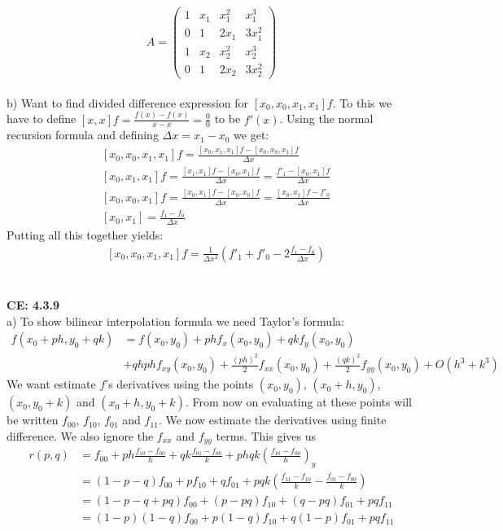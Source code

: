 \documentclass[11pt,a4paper]{report}
\begin{document}
$$ 
A = 
 \begin{pmatrix}
  1 & x_1 & x_1^2 &  x_1^3 \\
  0 & 1 & 2x_1 & 3x_1^2 \\
  1 & x_2 & x_2^2  & x_2^3  \\
  0 & 1 & 2x_2  & 3x_2^2 
 \end{pmatrix}
$$
\\
b) Want to find divided difference expression for $[x_0,x_0,x_1,x_1]f$. To this we have to define $[x,x]f=\frac{f(x)-f(x)}{x-x}=\frac{0}{0}$ to be $f'(x)$. Using the normal recursion formula and defining $\Delta x=x_1-x_0$ we get:
\begin{align*}
&[x_0,x_0,x_1,x_1]f = \frac{[x_0,x_1,x_1]f-[x_0,x_0,x_1]f}{\Delta x} \\
&[x_0,x_1,x_1]f = \frac{[x_1,x_1]f-[x_0,x_1]f}{\Delta x} = \frac{f'_1-[x_0,x_1]f}{\Delta x} \\
&[x_0,x_0,x_1]f = \frac{[x_0,x_1]f-[x_0,x_0]f}{\Delta x}=\frac{[x_0,x_1]f-f'_0}{\Delta x} \\
&[x_0,x_1]=\frac{f_1-f_0}{\Delta x}
\end{align*}  
Putting all this together yields:
\begin{align*}
&[x_0,x_0,x_1,x_1]f = \frac{1}{\Delta x^2}(f'_1+f'_0 -2\frac{f_1-f_0}{\Delta x})
\end{align*}
\\
\\
\textbf{CE: 4.3.9}
\\
a) To show bilinear interpolation formula we need Taylor's formula:
\begin{align*}
f(x_0+ph,y_0+qk)&= f(x_0,y_0) + phf_x(x_0,y_0)+qkf_y(x_0,y_0)\\
&+qhphf_{xy}(x_0,y_0)+\frac{(ph)^2}{2}f_{xx}(x_0,y_0)+\frac{(qk)^2}{2}f_{yy}(x_0,y_0) +O(h^3+k^3)
\end{align*}
We want estimate $f$'s derivatives using the points $(x_0,y_0)$, $(x_0+h,y_0)$, $(x_0,y_0+k)$ and $(x_0+h,y_0+k)$. From now on evaluating at these points will be written $f_{00}$, $f_{10}$, $f_{01}$ and $f_{11}$. We now estimate the derivatives using finite difference. We also ignore the $f_{xx}$ and $f_{yy}$ terms. This gives us 
\begin{align*}
r(p,q)&=f_{00} +ph\frac{f_{10}-f_{00}}{h}+qk\frac{f_{01}-f_{00}}{k} +phqk(\frac{f_{10}-f_{00}}{h})_y \\
&=(1-p-q)f_{00} + pf_{10}+qf_{01} +pqk(\frac{f_{11}-f_{10}}{k}-\frac{f_{01}-f_{00}}{k}) \\
&= (1-p-q+pq)f_{00} +(p-pq)f_{10}+(q-pq)f_{01}+ pqf_{11} \\
&=(1-p)(1-q)f_{00}+p(1-q)f_{10}+q(1-p)f_{01}+ pqf_{11}
\end{align*} 
\end{document}
